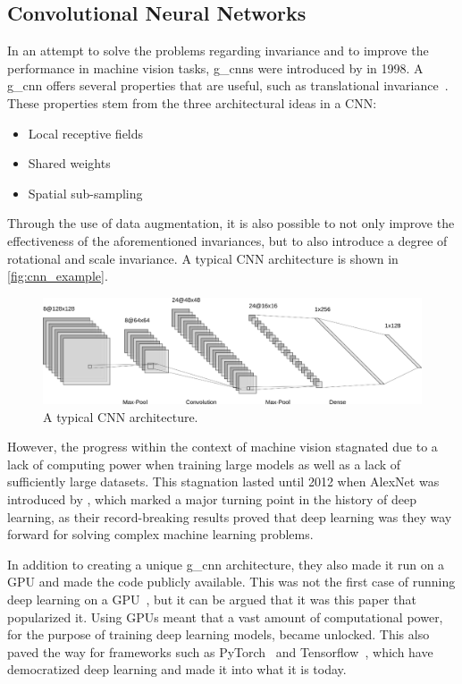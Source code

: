 \subsection{Convolutional Neural Networks}
In an attempt to solve the problems regarding invariance and to improve the performance in machine vision tasks, \glspl*{g_cnn} were introduced by \textcite{cnn} in 1998. A \gls*{g_cnn} offers several properties that are useful, such as translational invariance~\cite{cnn}. These properties stem from the three architectural ideas in a CNN:
\begin{itemize}
    \item Local receptive fields
    \item Shared weights
    \item Spatial sub-sampling
\end{itemize}
Through the use of data augmentation, it is also possible to not only improve the effectiveness of the aforementioned invariances, but to also introduce a degree of rotational and scale invariance. A typical CNN architecture is shown in \autoref{fig:cnn_example}.
\begin{figure}[H]
    \centering
    \includegraphics[width=\linewidth]{resources/related_works/cnn}
    \caption[Typical CNN Architecture]{ A typical CNN architecture. }
    \label{fig:cnn_example}
\end{figure}
\par
However, the progress within the context of machine vision stagnated due to a lack of computing power when training large models as well as a lack of sufficiently large datasets. This stagnation lasted until 2012 when AlexNet was introduced by \textcite{alexnet}, which marked a major turning point in the history of deep learning, as their record-breaking results proved that deep learning was they way forward for solving complex machine learning problems.
\par
In addition to creating a unique \gls*{g_cnn} architecture, they also made it run on a GPU and made the code publicly available. This was not the first case of running deep learning on a GPU~\cite{deeplearning_gpu}, but it can be argued that it was this paper that popularized it.  Using GPUs meant that a vast amount of computational power, for the purpose of training deep learning models, became unlocked. This also paved the way for frameworks such as PyTorch~\cite{pytorch} and Tensorflow~\cite{tensorflow}, which have democratized deep learning and made it into what it is today.
